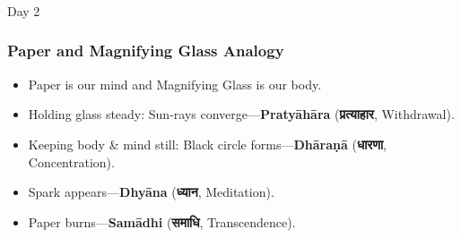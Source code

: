	  

\begin{frame}[fragile]\frametitle{}
\begin{center}
{\Large Day 2}
\end{center}
\end{frame}


\begin{frame}[fragile]\frametitle{Paper and Magnifying Glass Analogy}
      \begin{itemize}
      \item Paper is our mind and Magnifying Glass is our body.
      \item Holding glass steady: Sun-rays converge—\textbf{Pratyāhāra} (\textbf{प्रत्याहार}, Withdrawal).
      \item Keeping body \& mind still: Black circle forms—\textbf{Dhāraṇā} (\textbf{धारणा}, Concentration).
      \item Spark appears—\textbf{Dhyāna} (\textbf{ध्यान}, Meditation).
      \item Paper burns—\textbf{Samādhi} (\textbf{समाधि}, Transcendence).
      \end{itemize}
\end{frame}

